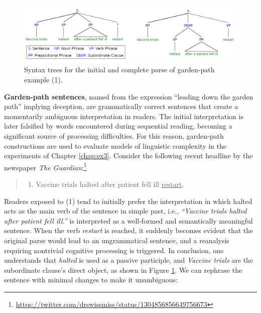 \documentclass[a4paper, nobind]{templates/ociamthesis}
\providecommand{\tightlist}{%
  \setlength{\itemsep}{0pt}\setlength{\parskip}{0pt}}
\begin{document}
\begin{figure}
\includegraphics[width=1\linewidth]{figures/1_syntax_trees_gp} \caption{Syntax trees for the initial and complete parse of garden-path example (1).}\label{fig:syntax-trees}
\end{figure}

\textbf{Garden-path sentences}, named from the expression ``leading down the garden path'' implying deception, are grammatically correct sentences that create a momentarily ambiguous interpretation in readers. The initial interpretation is later falsified by words encountered during sequential reading, becoming a significant source of processing difficulties. For this reason, garden-path constructions are used to evaluate models of linguistic complexity in the experiments of Chapter \ref{chap:ex3}. Consider the following recent headline by the newspaper \emph{The Guardian}:\footnote{\url{https://twitter.com/drswissmiss/status/1304856856649756673}}

\begin{quote}
\begin{enumerate}
\def\labelenumi{(\arabic{enumi})}
\tightlist
\item
  Vaccine trials halted after patient fell ill \underline{restart}.
\end{enumerate}
\end{quote}

Readers exposed to (1) tend to initially prefer the interpretation in which halted acts as the main verb of the sentence in simple past, i.e., \emph{``Vaccine trials halted after patient fell ill.''} is interpreted as a well-formed and semantically meaningful sentence. When the verb \emph{restart} is reached, it suddenly becomes evident that the original parse would lead to an ungrammatical sentence, and a reanalysis requiring nontrivial cognitive processing is triggered. In conclusion, one understands that \emph{halted} is used as a passive participle, and \emph{Vaccine trials} are the subordinate clause's direct object, as shown in Figure \ref{fig:syntax-trees}. We can rephrase the sentence with minimal changes to make it unambiguous:
\end{document}
